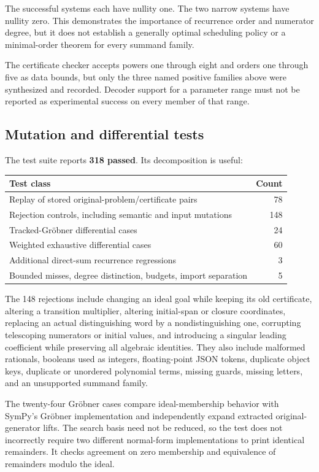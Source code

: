 The successful systems each have nullity one. The two narrow systems have
nullity zero. This demonstrates the importance of recurrence order and
numerator degree, but it does not establish a generally optimal scheduling
policy or a minimal-order theorem for every summand family.

The certificate checker accepts powers one through eight and orders one
through five as data bounds, but only the three named positive families above
were synthesized and recorded. Decoder support for a parameter range must not
be reported as experimental success on every member of that range.

\subsection{Mutation and differential tests}

The test suite reports \textbf{318 passed}. Its decomposition is useful:
\begin{center}
\begin{tabular}{@{}lr@{}}\toprule
Test class & Count \\
\midrule
Replay of stored original-problem/certificate pairs & 78 \\
Rejection controls, including semantic and input mutations & 148 \\
Tracked-Gr\"obner differential cases & 24 \\
Weighted exhaustive differential cases & 60 \\
Additional direct-sum recurrence regressions & 3 \\
Bounded misses, degree distinction, budgets, import separation & 5 \\
\bottomrule\end{tabular}
\end{center}

The 148 rejections include changing an ideal goal while keeping its old
certificate, altering a transition multiplier, altering initial-span or closure
coordinates, replacing an actual distinguishing word by a nondistinguishing
one, corrupting telescoping numerators or initial values, and introducing a
singular leading coefficient while preserving all algebraic identities. They
also include malformed rationals, booleans used as integers, floating-point
JSON tokens, duplicate object keys, duplicate or unordered polynomial terms,
missing guards, missing letters, and an unsupported summand family.

The twenty-four Gr\"obner cases compare ideal-membership behavior with SymPy's
Gr\"obner implementation and independently expand extracted original-generator
lifts. The search basis need not be reduced, so the test does not incorrectly
require two different normal-form implementations to print identical
remainders. It checks agreement on zero membership and equivalence of
remainders modulo the ideal.

